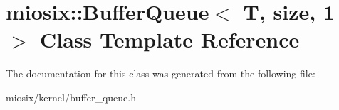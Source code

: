 \hypertarget{classmiosix_1_1_buffer_queue_3_01_t_00_01size_00_011_01_4}{\section{miosix\-:\-:Buffer\-Queue$<$ T, size, 1 $>$ Class Template Reference}
\label{classmiosix_1_1_buffer_queue_3_01_t_00_01size_00_011_01_4}
}


The documentation for this class was generated from the following file\-:\begin{DoxyCompactItemize}
\item 
miosix/kernel/buffer\-\_\-queue.\-h\end{DoxyCompactItemize}
